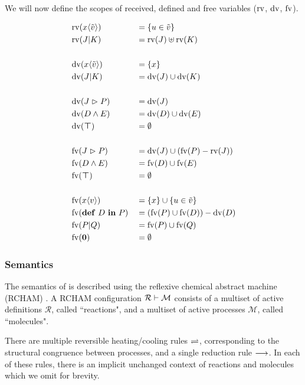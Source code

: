 We will now define the scopes of received, defined and free variables
($\operatorname{rv}$, $\operatorname{dv}$, $\operatorname{fv}$).

\begin{alignat*}{2}
  & \operatorname{rv}(x\langle\tilde{v}\rangle) & &= \{ u \in \tilde{v} \} \\
  & \operatorname{rv}(J | K)           & &= \operatorname{rv}(J) \uplus \operatorname{rv}(K) \\
  \\
  & \operatorname{dv}(x\langle\tilde{v}\rangle) & &= \{ x \} \\
  & \operatorname{dv}(J | K)           & &= \operatorname{dv}(J) \cup \operatorname{dv}(K) \\
  \\
  & \operatorname{dv}(J \vartriangleright P)         & &= \operatorname{dv}(J) \\
  & \operatorname{dv}(D \wedge E)           & &= \operatorname{dv}(D) \cup \operatorname{dv}(E) \\
  & \operatorname{dv}(\boldsymbol{\top})           & &= \emptyset \\
  \\
  & \operatorname{fv}(J \vartriangleright P)         & &= \operatorname{dv}(J) \cup (\operatorname{fv}(P) - \operatorname{rv}(J)) \\
  & \operatorname{fv}(D \wedge E)           & &= \operatorname{fv}(D) \cup \operatorname{fv}(E) \\
  & \operatorname{fv}(\boldsymbol{\top})           & &= \emptyset \\
  \\
  & \operatorname{fv}(x\langle v\rangle)         & &= \{ x \} \cup \{ u \in \tilde{v} \} \\
  & \operatorname{fv}(\textbf{\textup{def}} \ D \ \textbf{\textup{in}} \ P)         & &= (\operatorname{fv}(P) \cup \operatorname{fv}(D)) - \operatorname{dv}(D) \\
  & \operatorname{fv}(P | Q)           & &= \operatorname{fv}(P) \cup \operatorname{fv}(Q) \\
  & \operatorname{fv}(\textbf{\textup{0}})          & &= \emptyset \\
\end{alignat*}


\subsubsection{Semantics}

The semantics of \joincalc is described using the reflexive chemical abstract
machine (RCHAM) \cite{fournet_reflexive_1996}.
A RCHAM configuration
$ \rchamcnf{\mathcal{R}}{\mathcal{M}} $
consists of a multiset of active definitions $\mathcal{R}$,
called ``reactions",
and a multiset of active processes $\mathcal{M}$,
called ``molecules".

There are multiple reversible heating/cooling rules $\rightleftharpoons$,
corresponding to the structural congruence between processes,
and a single reduction rule $\longrightarrow$.
In each of these rules, there is an implicit unchanged context of reactions and
molecules which we omit for brevity.

